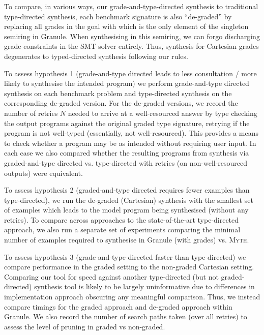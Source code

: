 To compare, in various ways, our grade-and-type-directed
synthesis to traditional type-directed synthesis, each benchmark
signature is also ``de-graded'' by replacing all grades in the goal
with  which is the only element of the singleton
 semiring in Granule. When synthesising in this
semiring, we can forgo discharging grade constraints in the SMT solver
entirely.  Thus, synthesis for Cartesian grades degenerates to
typed-directed synthesis following our rules.

To assess hypothesis 1 (grade-and-type directed leads to less consultation
/ more likely to synthesise the intended program) we perform grade-and-type
directed synthesis on each benchmark problem and type-directed synthesis
on the corresponding de-graded version. For the de-graded
versions, we record the number of
retries $N$ needed to arrive at a well-resourced answer by
type checking the output programs against
the original graded type signature, retrying if the program is not well-typed
(essentially, not well-resourced). This provides a means to check whether a program
may be as intended without requiring user input. In each
case we also compared whether the resulting programs from synthesis via graded-and-type directed
vs. type-directed with retries (on non-well-resourced outputs) were equivalent.

To assess hypothesis 2 (graded-and-type directed requires
fewer examples than type-directed), we run the de-graded (Cartesian)
synthesis with the smallest set of examples which
leads to the model program being synthesised (without any retries).
To compare across approaches to the state-of-the-art
type-directed approach, we also run
a separate set of experiments comparing the minimal number
of examples required to synthesise in Granule (with grades)
vs. \textsc{Myth}.

To assess hypothesis 3 (grade-and-type-directed faster than
type-directed) we compare performance in the graded setting to the
non-graded Cartesian setting. Comparing our tool for speed
against another type-directed (but not graded-directed) synthesis tool
is likely to be largely uninformative due to differences in
implementation approach obscuring any meaningful comparison. Thus, we
instead compare timings for the graded approach and de-graded approach
within Granule. We also record the number of search paths taken (over
all retries) to assess the level of pruning in graded vs
non-graded.



